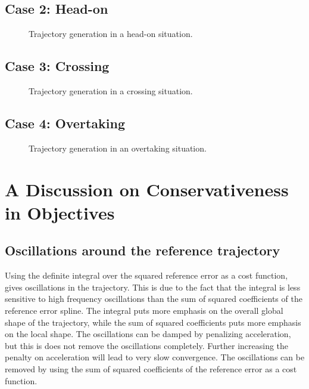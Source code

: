 \subsection{Case 2: Head-on}
\label{sec:case-2-head-on}
\begin{figure}
    \centering
    
    \caption{Trajectory generation in a head-on situation.}
    \label{fig:head-on}
\end{figure}

\subsection{Case 3: Crossing}
\label{sec:case-3-crossing}
\begin{figure}
    \centering
    
    \caption{Trajectory generation in a crossing situation.}
    \label{fig:crossing}
\end{figure}


\subsection{Case 4: Overtaking}
\label{sec:case-4-overtaking}
\begin{figure}
    \centering
    
    \caption{Trajectory generation in an overtaking situation.}
    \label{fig:overtaking}
\end{figure}

\section{A Discussion on Conservativeness in Objectives}

\subsection{Oscillations around the reference trajectory}
\label{sec:oscillations}
Using the definite integral over the squared reference error as a cost function, gives oscillations in the trajectory. This is due to the fact that the integral is less sensitive to high frequency oscillations than the sum of squared coefficients of the reference error spline. The integral puts more emphasis on the overall global shape of the trajectory, while the sum of squared coefficients puts more emphasis on the local shape. The oscillations can be damped by penalizing acceleration, but this is does not remove the oscillations completely. Further increasing the penalty on acceleration will lead to very slow convergence.
The oscillations can be removed by using the sum of squared coefficients of the reference error as a cost function.


